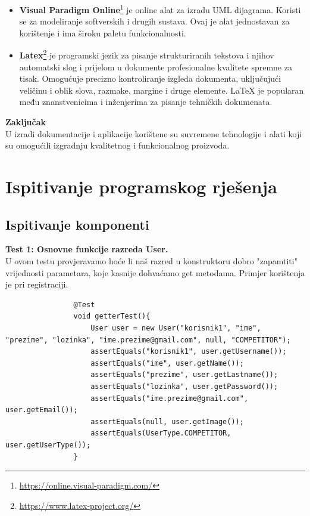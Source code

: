 \begin{itemize}
			\item\textbf{Visual Paradigm Online}\footnote{\url{https://online.visual-paradigm.com/}} je online alat za izradu UML dijagrama. Koristi se za modeliranje softverskih i drugih sustava. Ovaj je alat jednostavan za korištenje i ima široku paletu funkcionalnosti. 
			
			\item\textbf{Latex}\footnote{\url{https://www.latex-project.org/}} je programski jezik za pisanje strukturiranih tekstova i njihov automatski slog i prijelom u dokumente profesionalne kvalitete spremne za tisak. Omogućuje precizno kontroliranje izgleda dokumenta, uključujući veličinu i oblik slova, razmake, margine i druge elemente. LaTeX je popularan među znanstvenicima i inženjerima za pisanje tehničkih dokumenata.
			\end{itemize}
			
			\textbf{Zaključak}\\
			U izradi dokumentacije i aplikacije korištene su suvremene tehnologije i alati koji su omogućili izgradnju kvalitetnog i funkcionalnog proizvoda.
			
			
		
	
		\section{Ispitivanje programskog rješenja}
			
			
			\subsection{Ispitivanje komponenti}
					
			
						\textbf{Test 1: Osnovne funkcije razreda User.}\\
			U ovom testu provjeravamo hoće li naš razred u konstruktoru dobro "zapamtiti" vrijednosti parametara, koje kasnije dohvaćamo get metodama. Primjer korištenja je pri registraciji.
			\begin{lstlisting}
				@Test
				void getterTest(){
					User user = new User("korisnik1", "ime", "prezime", "lozinka", "ime.prezime@gmail.com", null, "COMPETITOR");
					assertEquals("korisnik1", user.getUsername());
					assertEquals("ime", user.getName());
					assertEquals("prezime", user.getLastname());
					assertEquals("lozinka", user.getPassword());
					assertEquals("ime.prezime@gmail.com", user.getEmail());
					assertEquals(null, user.getImage());
					assertEquals(UserType.COMPETITOR, user.getUserType());	
				}
			\end{lstlisting}
			
